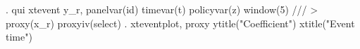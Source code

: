 . qui xtevent y_r, panelvar(id) timevar(t) policyvar(z) window(5) ///
>         proxy(x_r) proxyiv(select)
{\smallskip}
. xteventplot, proxy ytitle("Coefficient") xtitle("Event time")
